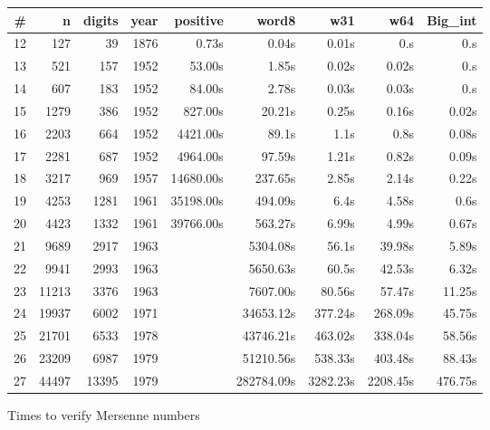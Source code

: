 \begin{figure}
\begin{center}
\begin{tabular}{|r|r|r|r|r|r|r|r|r |}
\hline
\# & n & digits & year &  positive & word8 & w31 & w64 & Big\_int\\
\hline
12 &  127 &  39 & 1876 &  0.73s & 0.04s & 0.01s & 0.s & 0.s \\
13 &  521 & 157 & 1952 &  53.00s & 1.85s & 0.02s & 0.02s &  0.s\\
14 &  607 & 183 & 1952 &  84.00s & 2.78s & 0.03s & 0.03s &  0.s\\
15 & 1279 & 386 & 1952 &  827.00s & 20.21s& 0.25s & 0.16s &  0.02s\\
16 & 2203 & 664 & 1952 &  4421.00s & 89.1s & 1.1s & 0.8s &  0.08s\\
17 & 2281 & 687 & 1952 &  4964.00s & 97.59s & 1.21s & 0.82s &  0.09s\\
18 & 3217 & 969 & 1957 &  14680.00s & 237.65s & 2.85s & 2.14s &  0.22s\\
19 & 4253 & 1281 & 1961 &35198.00s & 494.09s& 6.4s & 4.58s &  0.6s\\
20 & 4423 & 1332 & 1961 &  39766.00s & 563.27s & 6.99s & 4.99s &  0.67s\\
21 & 9689 & 2917  & 1963 &   & 5304.08s & 56.1s & 39.98s &  5.89s\\	 
22 & 9941 & 2993  & 1963 &   & 5650.63s & 60.5s & 42.53s &  6.32s\\	 
23 & 11213 & 3376 & 1963 &    & 7607.00s & 80.56s & 57.47s &  11.25s\\ 
24 & 19937 & 6002  & 1971 &  & 34653.12s & 377.24s & 268.09s &  45.75s\\
25 & 21701 & 6533 & 1978 &  &43746.21s & 463.02s & 338.04s &  58.56s \\
26 & 23209 & 6987 & 1979  &  &51210.56s & 538.33s & 403.48s &  88.43s\\
27 & 44497 & 13395 & 1979  &  &282784.09s & 3282.23s & 2208.45s &  476.75s \\
\hline

\end{tabular}
\end{center}
\caption{Times to verify Mersenne numbers}
\label{fig:Mersenne}
\end{figure}
